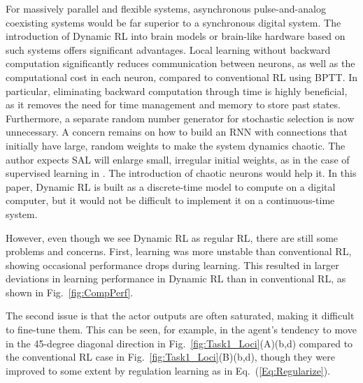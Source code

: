 For massively parallel and flexible systems, asynchronous pulse-and-analog coexisting systems would be far superior
to a synchronous digital system.
The introduction of Dynamic RL into brain models or brain-like hardware
based on such systems offers significant advantages.
Local learning without backward computation significantly reduces communication between neurons,
as well as the computational cost in each neuron, compared to conventional RL using BPTT.
In particular, eliminating backward computation through time is highly beneficial,
as it removes the need for time management and memory to store past states.
Furthermore, a separate random number generator for stochastic selection is now unnecessary.
A concern remains on how to build an RNN with connections that initially have large, random weights
to make the system dynamics chaotic.
The author expects SAL will enlarge small, irregular initial weights,
as in the case of supervised learning in \citep{Sensitivity}.
The introduction of chaotic neurons \citep{Aihara} would help it.
In this paper, Dynamic RL is built as a discrete-time model to compute on a digital computer,
but it would not be difficult to implement it on a continuous-time system.

However, even though we see Dynamic RL as regular RL, there are still some problems and concerns.
First, learning was more unstable than conventional RL, showing occasional performance drops during learning.
This resulted in larger deviations in learning performance in Dynamic RL than in conventional RL,
as shown in Fig.~\ref{fig:CompPerf}.

The second issue is that the actor outputs are often saturated, making it difficult to fine-tune them.
This can be seen, for example, in the agent's tendency to move in the 45-degree diagonal direction in Fig.~\ref{fig:Task1_Loci}(A)(b,d)
compared to the conventional RL case in Fig.~\ref{fig:Task1_Loci}(B)(b,d),
though they were improved to some extent by regulation learning as in Eq.~(\ref{Eq:Regularize}).

